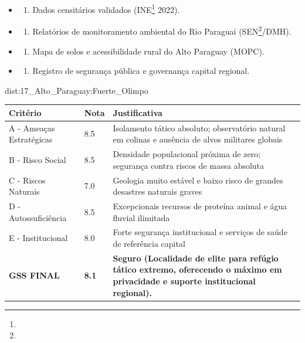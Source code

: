 {\begin{itemize}
\tightlist
\item
  \begin{enumerate}
  \def\labelenumi{\arabic{enumi})}
  \tightlist
  \item
    Dados censitários validados (INE\footnote{\fineINE} 2022).
  \end{enumerate}
\item
  \begin{enumerate}
  \def\labelenumi{\arabic{enumi})}
  \setcounter{enumi}{1}
  \tightlist
  \item
    Relatórios de monitoramento ambiental do Rio Paraguai (SEN\footnote{\fineSEN}/\allowbreak DMH).
  \end{enumerate}
\item
  \begin{enumerate}
  \def\labelenumi{\arabic{enumi})}
  \setcounter{enumi}{2}
  \tightlist
  \item
    Mapa de solos e acessibilidade rural do Alto Paraguay (MOPC).
  \end{enumerate}
\item
  \begin{enumerate}
  \def\labelenumi{\arabic{enumi})}
  \setcounter{enumi}{3}
  \tightlist
  \item
    Registro de segurança pública e governança capital regional.
  \end{enumerate}
\end{itemize}}{dist:17_Alto_Paraguay:Fuerte_Olimpo}
\begin{table}[ht!]
\small \begin{tabular}{p{3.0cm}p{0.8cm}p{6.0cm}} \toprule
\textbf{Critério} & \textbf{Nota} & \textbf{Justificativa} \\ \midrule
A - Ameaças Estratégicas & 8.5 & Isolamento tático absoluto; observatório natural em colinas e ausência de alvos militares globais \\
B - Risco Social & 8.5 & Densidade populacional próxima de zero; segurança contra riscos de massa absoluta \\
C - Riscos Naturais & 7.0 & Geologia muito estável e baixo risco de grandes desastres naturais graves \\
D - Autossuficiência & 8.5 & Excepcionais recursos de proteína animal e água fluvial ilimitada \\
E - Institucional & 8.0 & Forte segurança institucional e serviços de saúde de referência capital \\
\midrule \textbf{GSS FINAL} & \textbf{8.1} & \textbf{Seguro (Localidade de elite para refúgio tático extremo, oferecendo o máximo em privacidade e suporte institucional regional).} \\ \bottomrule \end{tabular}
\end{table}
